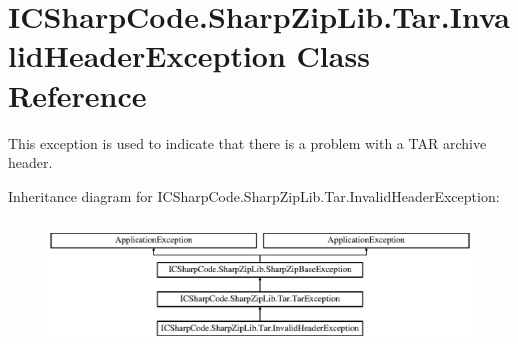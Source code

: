 \hypertarget{class_i_c_sharp_code_1_1_sharp_zip_lib_1_1_tar_1_1_invalid_header_exception}{}\section{I\+C\+Sharp\+Code.\+Sharp\+Zip\+Lib.\+Tar.\+Invalid\+Header\+Exception Class Reference}
\label{class_i_c_sharp_code_1_1_sharp_zip_lib_1_1_tar_1_1_invalid_header_exception}


This exception is used to indicate that there is a problem with a T\+AR archive header.  


Inheritance diagram for I\+C\+Sharp\+Code.\+Sharp\+Zip\+Lib.\+Tar.\+Invalid\+Header\+Exception\+:\begin{figure}[H]
\begin{center}
\leavevmode
\includegraphics[height=3.383686cm]{class_i_c_sharp_code_1_1_sharp_zip_lib_1_1_tar_1_1_invalid_header_exception}
\end{center}
\end{figure}
